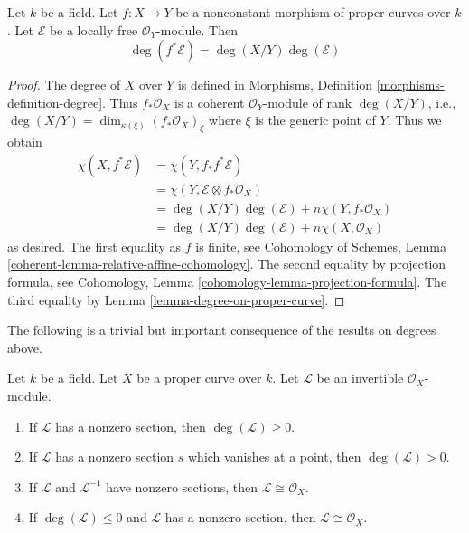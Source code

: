 \begin{lemma}
\label{lemma-degree-pullback-map-proper-curves}
Let $k$ be a field. Let $f : X \to Y$ be a nonconstant morphism of
proper curves over $k$. Let $\mathcal{E}$ be a locally free
$\mathcal{O}_Y$-module. Then
$$
\deg(f^*\mathcal{E}) = \deg(X/Y) \deg(\mathcal{E})
$$
\end{lemma}

\begin{proof}
The degree of $X$ over $Y$ is defined in
Morphisms, Definition \ref{morphisms-definition-degree}.
Thus $f_*\mathcal{O}_X$ is a coherent $\mathcal{O}_Y$-module
of rank $\deg(X/Y)$, i.e.,
$\deg(X/Y) = \dim_{\kappa(\xi)} (f_*\mathcal{O}_X)_\xi$ where $\xi$
is the generic point of $Y$. Thus we obtain
\begin{align*}
\chi(X, f^*\mathcal{E})
& =
\chi(Y, f_*f^*\mathcal{E}) \\
& =
\chi(Y, \mathcal{E} \otimes f_*\mathcal{O}_X) \\
& =
\deg(X/Y) \deg(\mathcal{E}) + n \chi(Y, f_*\mathcal{O}_X) \\
& =
\deg(X/Y) \deg(\mathcal{E}) + n \chi(X, \mathcal{O}_X)
\end{align*}
as desired. The first equality as $f$ is finite, see
Cohomology of Schemes, Lemma \ref{coherent-lemma-relative-affine-cohomology}.
The second equality by projection formula, see
Cohomology, Lemma \ref{cohomology-lemma-projection-formula}.
The third equality by Lemma \ref{lemma-degree-on-proper-curve}.
\end{proof}

\noindent
The following is a trivial but important consequence of the
results on degrees above.

\begin{lemma}
\label{lemma-check-invertible-sheaf-trivial}
Let $k$ be a field. Let $X$ be a proper curve over $k$.
Let $\mathcal{L}$ be an invertible $\mathcal{O}_X$-module.
\begin{enumerate}
\item If $\mathcal{L}$ has a nonzero section, then
$\deg(\mathcal{L}) \geq 0$.
\item If $\mathcal{L}$ has a nonzero section $s$ which vanishes
at a point, then $\deg(\mathcal{L}) > 0$.
\item If $\mathcal{L}$ and $\mathcal{L}^{-1}$ have nonzero sections, then
$\mathcal{L} \cong \mathcal{O}_X$.
\item If $\deg(\mathcal{L}) \leq 0$ and $\mathcal{L}$ has a nonzero
section, then $\mathcal{L} \cong \mathcal{O}_X$.
\end{enumerate}
\end{lemma}

